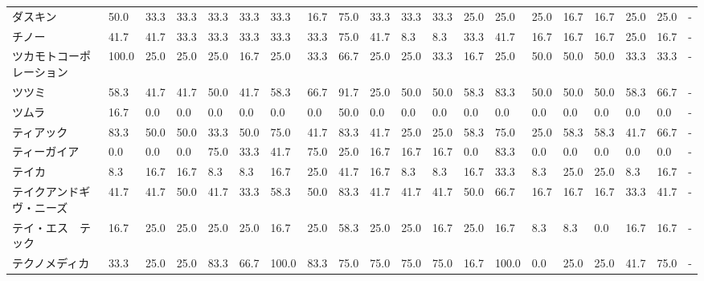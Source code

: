 \begin{tabular}{llllllllllllllllllll}
ダスキン            &   50.0 &   33.3 &      33.3 &      33.3 &       33.3 &   33.3 &   16.7 &   75.0 &    33.3 &    33.3 &   33.3 &  25.0 &   25.0 &    25.0 &    16.7 &  16.7 &  25.0 &  25.0 &     - \\
チノー             &   41.7 &   41.7 &      33.3 &      33.3 &       33.3 &   33.3 &   33.3 &   75.0 &    41.7 &     8.3 &    8.3 &  33.3 &   41.7 &    16.7 &    16.7 &  16.7 &  25.0 &  16.7 &     - \\
ツカモトコーポレーション    &  100.0 &   25.0 &      25.0 &      25.0 &       16.7 &   25.0 &   33.3 &   66.7 &    25.0 &    25.0 &   33.3 &  16.7 &   25.0 &    50.0 &    50.0 &  50.0 &  33.3 &  33.3 &     - \\
ツツミ             &   58.3 &   41.7 &      41.7 &      50.0 &       41.7 &   58.3 &   66.7 &   91.7 &    25.0 &    50.0 &   50.0 &  58.3 &   83.3 &    50.0 &    50.0 &  50.0 &  58.3 &  66.7 &     - \\
ツムラ             &   16.7 &    0.0 &       0.0 &       0.0 &        0.0 &    0.0 &    0.0 &   50.0 &     0.0 &     0.0 &    0.0 &   0.0 &    0.0 &     0.0 &     0.0 &   0.0 &   0.0 &   0.0 &     - \\
ティアック           &   83.3 &   50.0 &      50.0 &      33.3 &       50.0 &   75.0 &   41.7 &   83.3 &    41.7 &    25.0 &   25.0 &  58.3 &   75.0 &    25.0 &    58.3 &  58.3 &  41.7 &  66.7 &     - \\
ティーガイア          &    0.0 &    0.0 &       0.0 &      75.0 &       33.3 &   41.7 &   75.0 &   25.0 &    16.7 &    16.7 &   16.7 &   0.0 &   83.3 &     0.0 &     0.0 &   0.0 &   0.0 &   0.0 &     - \\
テイカ             &    8.3 &   16.7 &      16.7 &       8.3 &        8.3 &   16.7 &   25.0 &   41.7 &    16.7 &     8.3 &    8.3 &  16.7 &   33.3 &     8.3 &    25.0 &  25.0 &   8.3 &  16.7 &     - \\
テイクアンドギヴ・ニーズ    &   41.7 &   41.7 &      50.0 &      41.7 &       33.3 &   58.3 &   50.0 &   83.3 &    41.7 &    41.7 &   41.7 &  50.0 &   66.7 &    16.7 &    16.7 &  16.7 &  33.3 &  41.7 &     - \\
テイ・エス　テック       &   16.7 &   25.0 &      25.0 &      25.0 &       25.0 &   16.7 &   25.0 &   58.3 &    25.0 &    25.0 &   16.7 &  25.0 &   16.7 &     8.3 &     8.3 &   0.0 &  16.7 &  16.7 &     - \\
テクノメディカ         &   33.3 &   25.0 &      25.0 &      83.3 &       66.7 &  100.0 &   83.3 &   75.0 &    75.0 &    75.0 &   75.0 &  16.7 &  100.0 &     0.0 &    25.0 &  25.0 &  41.7 &  75.0 &     - \\

\end{tabular}
